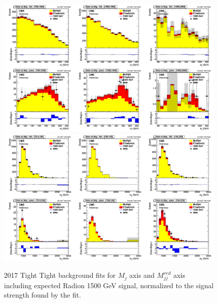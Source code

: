 \begin{figure}[!htb]
	\centering
	\includegraphics[width=\textwidth]{Figures/postfit_projx_fits_17TT.png}
	\includegraphics[width=1\textwidth]{Figures/postfit_projy_fits_17TT.png}
	\caption{2017 Tight Tight background fits for $M_j$ axis and $M_{jj}^{red}$ axis including expected Radion 1500 GeV signal, normalized to the signal strength found by the fit.}
	\label{fig:17TT}
\end{figure}
